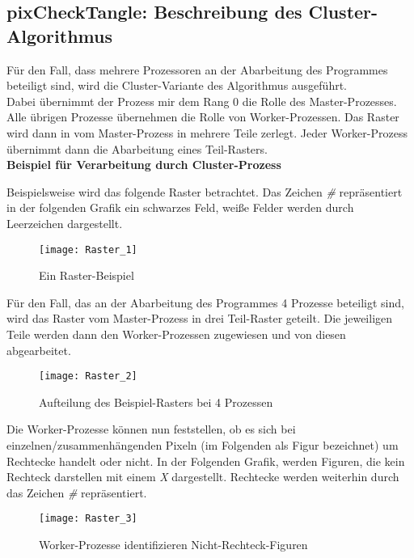 \documentclass[
10pt, %
a4paper, %
oneside, %
headinclude,footinclude, %
BCOR5mm, %
]{scrartcl}
\begin{document}
\subsection{pixCheckTangle: Beschreibung des Cluster-Algorithmus}

Für den Fall, dass mehrere Prozessoren an der Abarbeitung des Programmes beteiligt sind, wird die Cluster-Variante des Algorithmus ausgeführt.\\
Dabei übernimmt der Prozess mir dem Rang 0 die Rolle des Master-Prozesses. Alle übrigen Prozesse übernehmen die Rolle von Worker-Prozessen. Das Raster wird dann in vom Master-Prozess in mehrere Teile zerlegt. Jeder Worker-Prozess übernimmt dann die Abarbeitung eines Teil-Rasters. \\

\textbf{Beispiel für Verarbeitung durch Cluster-Prozess}

Beispielsweise wird das folgende Raster betrachtet. Das Zeichen \textit{\#} repräsentiert in der folgenden Grafik ein schwarzes Feld, weiße Felder werden durch Leerzeichen dargestellt.
\begin{figure}[h]
	\centering 
	\texttt{[image: Raster\_1]} 
	\caption[Cluster-Prozess: Beispiel-Raster]{Ein Raster-Beispiel }
\end{figure}

Für den Fall, das an der Abarbeitung des Programmes 4 Prozesse beteiligt sind, wird das Raster vom Master-Prozess in drei Teil-Raster geteilt. Die jeweiligen Teile werden dann den Worker-Prozessen zugewiesen und von diesen abgearbeitet.

\begin{figure}[h]
	\centering 
	\texttt{[image: Raster\_2]} 
	\caption[Cluster-Prozess: Aufteilung Beispiel-Raster mit 4 Prozessen]{Aufteilung des Beispiel-Rasters bei 4 Prozessen}
\end{figure}

Die Worker-Prozesse können nun feststellen, ob es sich bei einzelnen/zusammenhängenden Pixeln (im Folgenden als Figur bezeichnet) um Rechtecke handelt oder nicht. In der Folgenden Grafik, werden Figuren, die kein Rechteck darstellen mit einem \textit{X} dargestellt. Rechtecke werden weiterhin durch das Zeichen \textit{\#} repräsentiert.

\begin{figure}[h]
	\centering 
	\texttt{[image: Raster\_3]} 
	\caption[Cluster-Prozess: Worker-Prozess: Nicht-Rechteck-Figuren]{Worker-Prozesse identifizieren Nicht-Rechteck-Figuren}
\end{figure}
\end{document}
